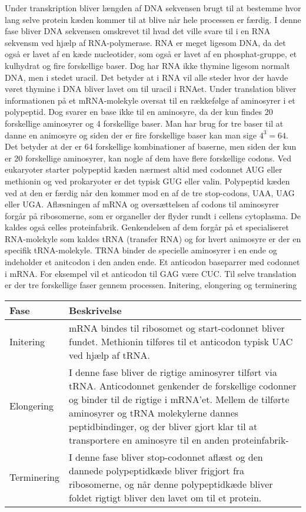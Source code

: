Under transkription bliver længden af DNA sekvensen brugt til at bestemme hvor lang selve protein kæden kommer til at blive når hele processen er færdig. I denne fase bliver DNA sekvensen omskrevet til hvad det ville svare til i en RNA sekvensm ved hjælp af RNA-polymerase. RNA er meget ligesom DNA, da det også er lavet af en kæde nucleotider, som også er lavet af en phosphat-gruppe, et kulhydrat og fire forskellige baser. Dog har RNA ikke thymine ligesom normalt DNA, men i stedet uracil. Det betyder at i RNA vil alle steder hvor der havde vøret thymine i DNA bliver lavet om til uracil i RNAet. 
Under translation bliver informationen på et mRNA-molekyle oversat til en rækkefølge af aminosyrer i et polypeptid. 
Dog svarer en base ikke til en aminosyre, da der kun findes 20 forskellige aminosyrer og 4 forskellige baser. Man har brug for tre baser til at danne en animosyre og siden der er fire forskellige baser kan man sige \begin{math}4^3=64\end{math}. Det betyder at der er 64 forskellige kombinationer af baserne, men siden der kun er 20 forskellige aminosyrer, kan nogle af dem have flere forskellige codons. Ved eukaryoter starter polypeptid kæden nærmest altid med codonnet AUG eller methionin og ved prokaryoter er det typisk GUG eller valin. 
Polypeptid kæden ved at den er færdig når den kommer mod en af de tre stop-codons, UAA, UAG eller UGA.
Aflæsningen af mRNA og oversættelsen af codons til aminosyrer forgår på ribosomerne, som er organeller der flyder rundt i cellens cytoplasma. De kaldes også celles proteinfabrik. Genkendelsen af dem forgår på et specialiseret RNA-molekyle som kaldes tRNA (transfer RNA) og for hvert animosyre er der en specifik tRNA-molekyle. TRNA binder de specielle aminosyrer i en ende og indeholder et anitcodon i den anden ende. Et anticodon baseparrer med codonnet i mRNA. For eksempel vil et anticodon til GAG være CUC.
Til selve translation er der tre forskellige faser gennem processen. Initering, elongering og terminering
\begin{longtable}{| m{2cm} | m{7cm} | }
    \hline 
    Fase & Beskrivelse \\ \hline
    Initering & mRNA bindes til ribosomet og start-codonnet bliver fundet. Methionin tilføres til et anticodon typisk UAC ved hjælp af tRNA. \\ \hline
    Elongering & I denne fase bliver de rigtige aminosyrer tilført via tRNA. Anticodonnet genkender de forskellige codonner og binder til de rigtige i mRNA'et. Mellem de tilførte aminosyrer og tRNA molekylerne dannes peptidbindinger, og der bliver gjort klar til at transportere en aminosyre til en anden proteinfabrik- \\ \hline
    Terminering & I denne fase bliver stop-codonnet aflæst og den dannede polypeptidkæde bliver frigjort fra ribosomerne, og når denne polypeptidkæde bliver foldet rigtigt bliver den lavet om til et protein. \\ \hline
\end{longtable}
